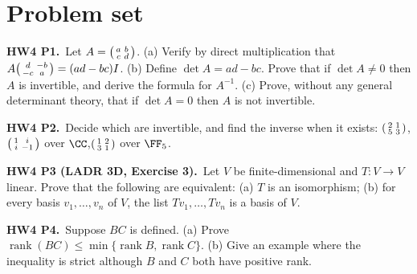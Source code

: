 \documentclass[10pt]{scrartcl}
\begin{document}
\section{Problem set}

\begin{prob}\textbf{HW4 P1.}\ Let $A=\begin{psmallmatrix}a&b\\c&d\end{psmallmatrix}$. (a) Verify by direct multiplication that $A\begin{psmallmatrix}d&-b\\-c&a\end{psmallmatrix}=(ad-bc)I$. (b) Define $\det A=ad-bc$. Prove that if $\det A\ne0$ then $A$ is invertible, and derive the formula for $A^{-1}$. (c) Prove, without any general determinant theory, that if $\det A=0$ then $A$ is not invertible.


\end{prob}
\begin{prob}\textbf{HW4 P2.}\ Decide which are invertible, and find the inverse when it exists:
$\begin{psmallmatrix}2&1\\5&3\end{psmallmatrix}$,\quad $\begin{psmallmatrix}1&i\\i&-1\end{psmallmatrix}$ over $\CC$,\quad $\begin{psmallmatrix}1&2\\3&1\end{psmallmatrix}$ over $\FF_5$.


\end{prob}
\begin{prob}\textbf{HW4 P3 (LADR 3D, Exercise 3).}\ Let $V$ be finite-dimensional and $T\colon V\to V$ linear. Prove that the following are equivalent: (a) $T$ is an isomorphism; (b) for every basis $v_1,\dots,v_n$ of $V$, the list $Tv_1,\dots,Tv_n$ is a basis of $V$.


\end{prob}
\begin{prob}\textbf{HW4 P4.}\ Suppose $BC$ is defined. (a) Prove $\operatorname{rank}(BC)\le\min\{\operatorname{rank}B,\operatorname{rank}C\}$. (b) Give an example where the inequality is strict although $B$ and $C$ both have positive rank.


\end{prob}
\end{document}

